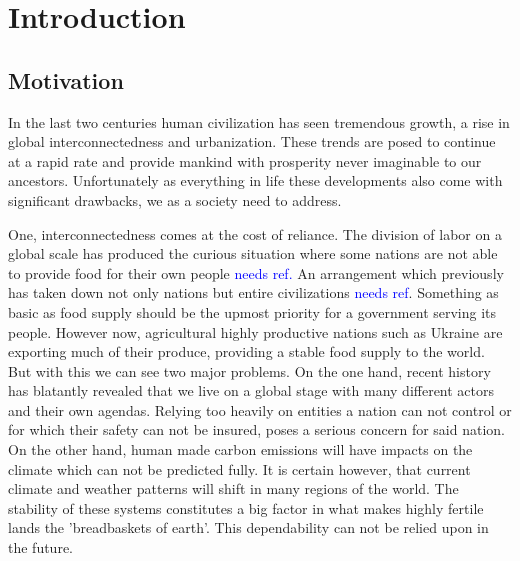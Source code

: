 \chapter{Introduction}
\label{chap:Introduction}


\section{Motivation}
\label{sec:Motivation}
In the last two centuries human civilization has seen tremendous growth, a rise in global interconnectedness and urbanization.
These trends are posed to continue at a rapid rate and provide mankind with prosperity never imaginable to our ancestors.
Unfortunately as everything in life these developments also come with significant drawbacks, we as a society need to address.

One, interconnectedness comes at the cost of reliance.
The division of labor on a global scale has produced the curious situation where some nations are not able to provide food for their own people \textcolor{Blue}{needs ref.}
An arrangement which previously has taken down not only nations but entire civilizations \textcolor{Blue}{needs ref}.
Something as basic as food supply should be the upmost priority for a government serving its people.
However now, agricultural highly productive nations such as Ukraine are exporting much of their produce, providing a stable food supply to the world.
But with this we can see two major problems.
On the one hand, recent history has blatantly revealed that we live on a global stage with many different actors and their own agendas.
Relying too heavily on entities a nation can not control or for which their safety can not be insured, poses a serious concern for said nation.
On the other hand, human made carbon emissions will have impacts on the climate which can not be predicted fully.
It is certain however, that current climate and weather patterns will shift in many regions of the world.
The stability of these systems constitutes a big factor in what makes highly fertile lands the 'breadbaskets of earth'.
This dependability can not be relied upon in the future.

